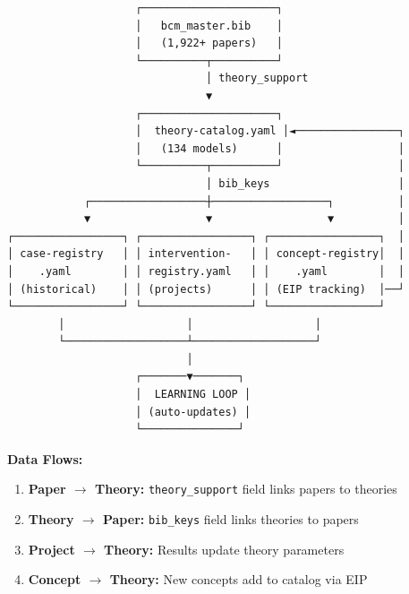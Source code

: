 \begin{tcolorbox}[colback=purple!3!white, colframe=purple!60!black,
    title=\textbf{Database Connection Architecture}]

\begin{verbatim}
                    ┌─────────────────────┐
                    │   bcm_master.bib    │
                    │   (1,922+ papers)   │
                    └──────────┬──────────┘
                               │ theory_support
                               ▼
                    ┌─────────────────────┐
                    │  theory-catalog.yaml │◄────────────────┐
                    │   (134 models)      │                  │
                    └──────────┬──────────┘                  │
                               │ bib_keys                    │
            ┌──────────────────┼──────────────────┐          │
            ▼                  ▼                  ▼          │
┌─────────────────┐ ┌─────────────────┐ ┌─────────────────┐  │
│ case-registry   │ │ intervention-   │ │ concept-registry│  │
│    .yaml        │ │ registry.yaml   │ │    .yaml        │  │
│ (historical)    │ │ (projects)      │ │ (EIP tracking)  │──┘
└─────────────────┘ └─────────────────┘ └─────────────────┘
        │                   │                   │
        └───────────────────┴───────────────────┘
                            │
                    ┌───────▼───────┐
                    │  LEARNING LOOP │
                    │ (auto-updates) │
                    └───────────────┘
\end{verbatim}

\textbf{Data Flows:}
\begin{enumerate}[nosep]
    \item \textbf{Paper $\rightarrow$ Theory:} \texttt{theory\_support} field links papers to theories
    \item \textbf{Theory $\rightarrow$ Paper:} \texttt{bib\_keys} field links theories to papers
    \item \textbf{Project $\rightarrow$ Theory:} Results update theory parameters
    \item \textbf{Concept $\rightarrow$ Theory:} New concepts add to catalog via EIP
\end{enumerate}

\end{tcolorbox}

